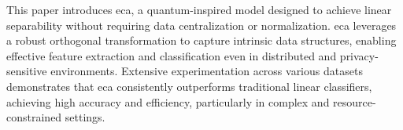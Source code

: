 \documentclass[conference]{IEEEtran}
\begin{document}
This paper introduces \Gls{eca}, a quantum-inspired model designed to achieve linear separability without requiring data centralization or normalization. \Gls{eca} leverages a robust orthogonal transformation to capture intrinsic data structures, enabling effective feature extraction and classification even in distributed and privacy-sensitive environments. Extensive experimentation across various datasets demonstrates that \Gls{eca} consistently outperforms traditional linear classifiers, achieving high accuracy and efficiency, particularly in complex and resource-constrained settings.








\end{document}
